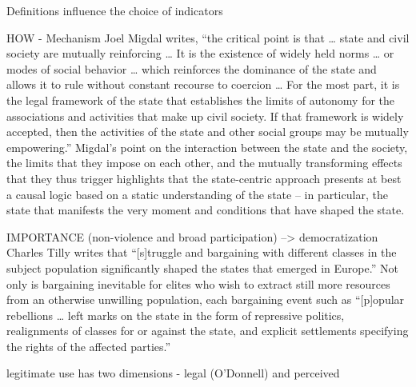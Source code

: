 \documentclass [11pt]{article}
\begin{document}
Definitions influence the choice of indicators


HOW - Mechanism
Joel Migdal writes, “the critical point is that … state and civil society are mutually reinforcing … It is the existence of widely held norms … or modes of social behavior … which reinforces the dominance of the state and allows it to rule without constant recourse to coercion … For the most part, it is the legal framework of the state that establishes the limits of autonomy for the associations and activities that make up civil society. If that framework is widely accepted, then the activities of the state and other social groups may be mutually empowering.”  Migdal’s point on the interaction between the state and the society, the limits that they impose on each other, and the mutually transforming effects that they thus trigger highlights that the state-centric approach presents at best a causal logic based on a static understanding of the state – in particular, the state that manifests the very moment and conditions that have shaped the state.

IMPORTANCE (non-violence and broad participation) --> democratization
Charles Tilly writes that “[s]truggle and bargaining with different classes in the subject population significantly shaped the states that emerged in Europe.” Not only is bargaining inevitable for elites who wish to extract still more resources from an otherwise unwilling population, each bargaining event such as “[p]opular rebellions … left marks on the state in the form of repressive politics, realignments of classes for or against the state, and explicit settlements specifying the rights of the affected parties.” 








  




legitimate use has two dimensions - legal (O'Donnell) and perceived
\end{document}
